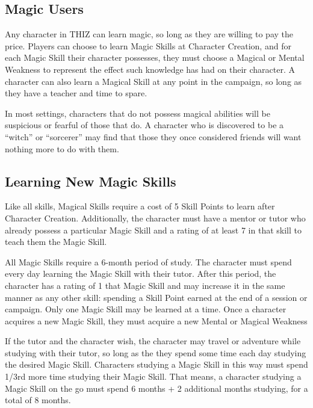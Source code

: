 \documentclass[oneside]{book}
\begin{document}
\begin{multicols}{2}
\subsection{Magic Users}
Any character in THIZ can learn magic, so long as they are willing to pay the price. Players can choose to learn Magic Skills at Character Creation, and for each Magic Skill their character possesses, they must choose a Magical or Mental Weakness to represent the effect such knowledge has had on their character. A character can also learn a Magical Skill at any point in the campaign, so long as they have a teacher and time to spare. 

In most settings, characters that do not possess magical abilities will be suspicious or fearful of those that do. A character who is discovered to be a ``witch'' or ``sorcerer'' may find that those they once considered friends will want nothing more to do with them.

\subsection{Learning New Magic Skills}
Like all skills, Magical Skills require a cost of 5 Skill Points to learn after Character Creation. Additionally, the character must have a mentor or tutor who already possess a particular Magic Skill and a rating of at least 7 in that skill to teach them the Magic Skill.

All Magic Skills require a 6-month period of study. The character must spend every day learning the Magic Skill with their tutor. After this period, the character has a rating of 1 that Magic Skill and may increase it in the same manner as any other skill: spending a Skill Point earned at the end of a session or campaign. Only one Magic Skill may be learned at a time. Once a character acquires a new Magic Skill, they must acquire a new Mental or Magical Weakness

If the tutor and the character wish, the character may travel or adventure while studying with their tutor, so long as the they spend some time each day studying the desired Magic Skill. Characters studying a Magic Skill in this way must spend 1/3rd more time studying their Magic Skill. That means, a character studying a Magic Skill on the go must spend 6 months + 2 additional months studying, for a total of 8 months. 


\end{multicols}
\end{document}
